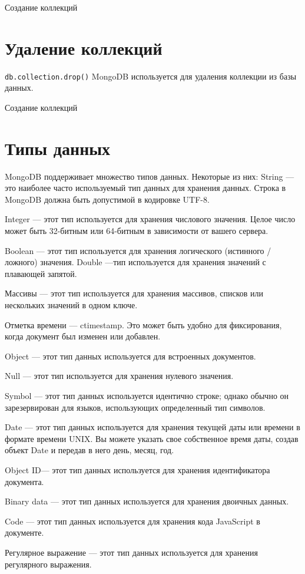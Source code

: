 \begin{image}
	\caption{Создание коллекций}
	\label{fig:create:collection}
\end{image}

\clearpage
\section{Удаление коллекций}

\texttt{db.collection.drop()} MongoDB используется для удаления коллекции из
базы данных.

\begin{image}
	\caption{Создание коллекций}
	\label{fig:create:collection}
\end{image}

\clearpage
\section{Типы данных}
MongoDB поддерживает множество типов данных.
Некоторые из них:
String — это наиболее часто используемый тип данных для хранения
данных. Строка в MongoDB должна быть допустимой в кодировке UTF-8.\par
Integer — этот тип используется для хранения числового значения. Целое
число может быть 32-битным или 64-битным в зависимости от вашего сервера.\par
Boolean — этот тип используется для хранения логического (истинного /
ложного) значения.
Double —тип используется для хранения значений с плавающей запятой.\par
Массивы — этот тип используется для хранения массивов, списков или
нескольких значений в одном ключе.\par
Отметка времени — ctimestamp. Это может быть удобно для
фиксирования, когда документ был изменен или добавлен.\par
Object — этот тип данных используется для встроенных документов.\par
Null — этот тип используется для хранения нулевого значения.\par
Symbol — этот тип данных используется идентично строке; однако
обычно он зарезервирован для языков, использующих определенный тип
символов.\par
Date — этот тип данных используется для хранения текущей даты или
времени в формате времени UNIX. Вы можете указать свое собственное время
даты, создав объект Date и передав в него день, месяц, год.\par
Object ID— этот тип данных используется для хранения идентификатора
документа.\par
Binary data — этот тип данных используется для хранения двоичных
данных.\par
Code — этот тип данных используется для хранения кода JavaScript в
документе.\par
Регулярное выражение — этот тип данных используется для хранения
регулярного выражения.\par

